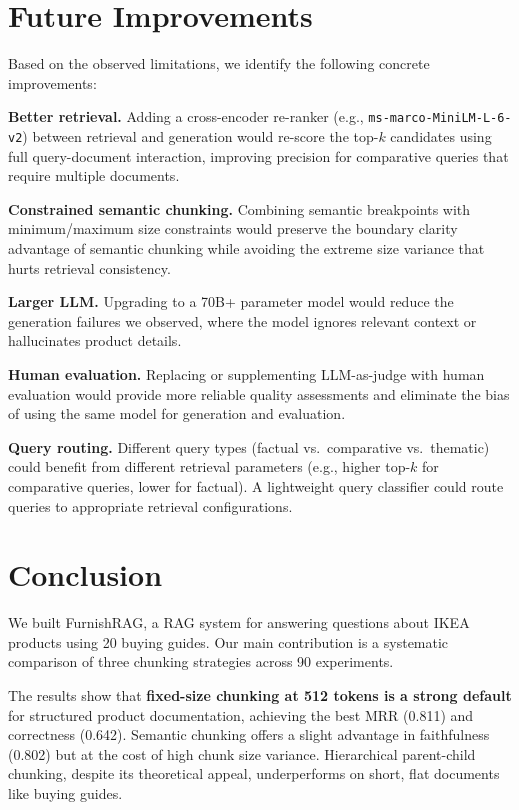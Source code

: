 \documentclass[conference]{IEEEtran}
\begin{document}
\section{Future Improvements}

Based on the observed limitations, we identify the following concrete improvements:

\textbf{Better retrieval.} Adding a cross-encoder re-ranker (e.g., \texttt{ms-marco-MiniLM-L-6-v2}) between retrieval and generation would re-score the top-$k$ candidates using full query-document interaction, improving precision for comparative queries that require multiple documents.

\textbf{Constrained semantic chunking.} Combining semantic breakpoints with minimum/maximum size constraints would preserve the boundary clarity advantage of semantic chunking while avoiding the extreme size variance that hurts retrieval consistency.

\textbf{Larger LLM.} Upgrading to a 70B+ parameter model would reduce the generation failures we observed, where the model ignores relevant context or hallucinates product details.

\textbf{Human evaluation.} Replacing or supplementing LLM-as-judge with human evaluation would provide more reliable quality assessments and eliminate the bias of using the same model for generation and evaluation.

\textbf{Query routing.} Different query types (factual vs.\ comparative vs.\ thematic) could benefit from different retrieval parameters (e.g., higher top-$k$ for comparative queries, lower for factual). A lightweight query classifier could route queries to appropriate retrieval configurations.

\section{Conclusion}

We built FurnishRAG, a RAG system for answering questions about IKEA products using 20 buying guides. Our main contribution is a systematic comparison of three chunking strategies across 90 experiments.

The results show that \textbf{fixed-size chunking at 512 tokens is a strong default} for structured product documentation, achieving the best MRR (0.811) and correctness (0.642). Semantic chunking offers a slight advantage in faithfulness (0.802) but at the cost of high chunk size variance. Hierarchical parent-child chunking, despite its theoretical appeal, underperforms on short, flat documents like buying guides.
\end{document}
